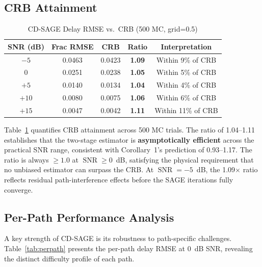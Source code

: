 \documentclass[journal]{IEEEtran}
\DeclareMathOperator{\SNR}{SNR}
\begin{document}
\subsection{CRB Attainment}

\begin{table}[t]
\centering
\caption{CD-SAGE Delay RMSE vs.\ CRB (500 MC, grid=0.5)}
\label{tab:crb}
\small
\begin{tabular}{@{}ccccc@{}}
\toprule
SNR (dB) & Frac RMSE & CRB & Ratio & Interpretation \\
\midrule
$-5$ & 0.0463 & 0.0423 & \textbf{1.09} & Within 9\% of CRB \\
$0$  & 0.0251 & 0.0238 & \textbf{1.05} & Within 5\% of CRB \\
$+5$ & 0.0140 & 0.0134 & \textbf{1.04} & Within 4\% of CRB \\
$+10$& 0.0080 & 0.0075 & \textbf{1.06} & Within 6\% of CRB \\
$+15$& 0.0047 & 0.0042 & \textbf{1.11} & Within 11\% of CRB \\
\bottomrule
\end{tabular}
\end{table}

Table~\ref{tab:crb} quantifies CRB attainment across 500 MC trials. The ratio of 1.04--1.11 establishes that the two-stage estimator is \textbf{asymptotically efficient} across the practical SNR range, consistent with Corollary~1's prediction of 0.93--1.17. The ratio is always $\ge 1.0$ at $\SNR \ge 0$~dB, satisfying the physical requirement that no unbiased estimator can surpass the CRB. At $\SNR = -5$~dB, the 1.09$\times$ ratio reflects residual path-interference effects before the SAGE iterations fully converge.

\subsection{Per-Path Performance Analysis}

A key strength of CD-SAGE is its robustness to path-specific challenges. Table~\ref{tab:perpath} presents the per-path delay RMSE at 0~dB SNR, revealing the distinct difficulty profile of each path.
\end{document}
